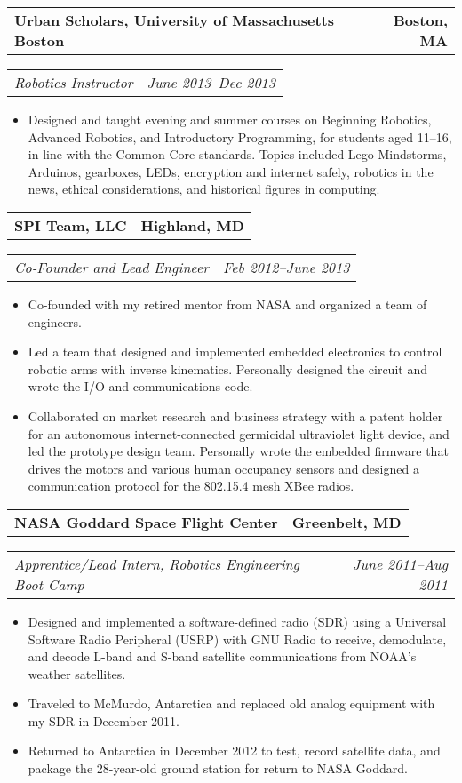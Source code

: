 \documentclass[10pt,letterpaper]{article}
\newcommand{\headerrow}[2]{%
    \begin{tabularx}{\linewidth}{Xr}
	    #1 & #2 \\
    \end{tabularx}
}
\begin{document}
    \headerrow{\textbf{Urban Scholars, University of Massachusetts Boston}}
		{\textbf{Boston, MA}}
	\headerrow{\textit{Robotics Instructor}}{\textit{June 2013--Dec 2013}}
    \begin{itemize}[label=--]
        \item Designed and taught evening and summer courses on Beginning
            Robotics, Advanced Robotics, and Introductory Programming, for
            students aged 11--16, in line with the Common Core standards.
            Topics included Lego Mindstorms, Arduinos, gearboxes, LEDs,
            encryption and internet safely, robotics in the news, ethical
            considerations, and historical figures in computing.
	\end{itemize}

	\headerrow{\textbf{SPI Team, LLC}}{\textbf{Highland, MD}}
	\headerrow{\textit{Co-Founder and Lead Engineer}}
		{\textit{Feb 2012--June 2013}}
    \begin{itemize}[label=--]
        \item Co-founded with my retired mentor from NASA and organized a team
            of engineers.

        \item Led a team that designed and implemented embedded electronics to
            control robotic arms with inverse kinematics.  Personally designed
            the circuit and wrote the I/O and communications code.

        \item Collaborated on market research and business strategy with a
            patent holder for an autonomous internet-connected germicidal
            ultraviolet light device, and led the prototype design team.
            Personally wrote the embedded firmware that drives the motors and
            various human occupancy sensors and designed a communication
            protocol for the 802.15.4 mesh XBee radios.
	\end{itemize}

	\headerrow{\textbf{NASA Goddard Space Flight Center}}{\textbf{Greenbelt, MD}}
	\headerrow{\textit{Apprentice/Lead Intern, Robotics Engineering Boot Camp}}
		{\textit{June 2011--Aug 2011}}
    \begin{itemize}[label=--]
        \item Designed and implemented a software-defined radio (SDR) using a
            Universal Software Radio Peripheral (USRP) with GNU Radio to
            receive, demodulate, and decode L-band and S-band satellite
            communications from NOAA's weather satellites.

        \item Traveled to McMurdo, Antarctica and replaced old analog
            equipment with my SDR in December 2011.

        \item Returned to Antarctica in December 2012 to test, record
            satellite data, and package the 28-year-old ground station for
            return to NASA Goddard.
	\end{itemize}
\end{document}
